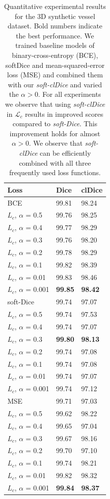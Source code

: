 \begin{table}[ht!]

\caption{ Quantitative experimental results for the 3D synthetic vessel dataset. Bold numbers indicate the best performance. We trained baseline models of binary-cross-entropy (BCE), softDice and mean-squared-error loss (MSE) and combined them with our \textit{soft-clDice} and varied the $\alpha > 0$. For all experiments we observe that using \textit{soft-clDice} in $\mathcal{L}_{c}$ results in improved scores  compared to \emph{soft-Dice}. This improvement holds for almost $\alpha > 0$. We observe that \textit{soft-clDice} can be efficiently combined with all three frequently used loss functions.}

\centering
\label{synth_data_table}

\begin{tabular}{|p{2.2cm}|p{1.4cm}|p{1.4cm}|}
        \hline
        Loss&Dice&clDice\\
        \hline
        BCE&99.81&98.24\\
        \hdashline
        $L_c$, $\alpha$ = 0.5&99.76&98.25\\
        $L_c$, $\alpha$ = 0.4&99.77&98.29\\
        $L_c$, $\alpha$ = 0.3&99.76&98.20\\
        $L_c$, $\alpha$ = 0.2&99.78&98.29\\
        $L_c$, $\alpha$ = 0.1&99.82&98.39\\
        $L_c$, $\alpha$ = 0.01&99.83&98.46\\
        $L_c$, $\alpha$ = 0.001&\textbf{99.85}&\textbf{98.42}\\
        \hline
        soft-Dice&99.74&97.07\\
  		\hdashline
        $L_c$, $\alpha$ = 0.5&99.74&97.53\\
        $L_c$, $\alpha$ = 0.4&99.74&97.07\\
        $L_c$, $\alpha$ = 0.3&\textbf{99.80}&\textbf{98.13}\\
        $L_c$, $\alpha$ = 0.2&99.74&97.08\\
        $L_c$, $\alpha$ = 0.1&99.74&97.08\\
        $L_c$, $\alpha$ = 0.01&99.74&97.07\\
        $L_c$, $\alpha$ = 0.001&99.74&97.12\\
        \hline
        MSE&99.71&97.03\\
  		\hdashline
        $L_{c}$, $\alpha$ = 0.5&99.62&98.22\\
        $L_c$, $\alpha$ = 0.4&99.65&97.04\\
        $L_c$, $\alpha$ = 0.3&99.67&98.16\\
        $L_c$, $\alpha$ = 0.2&99.70&97.10\\
        $L_c$, $\alpha$ = 0.1&99.74&98.21\\
        $L_c$, $\alpha$ = 0.01&99.82&98.32\\
        $L_c$, $\alpha$ = 0.001&\textbf{99.84}&\textbf{98.37}\\
   \hline \hline
\end{tabular}


\end{table}
